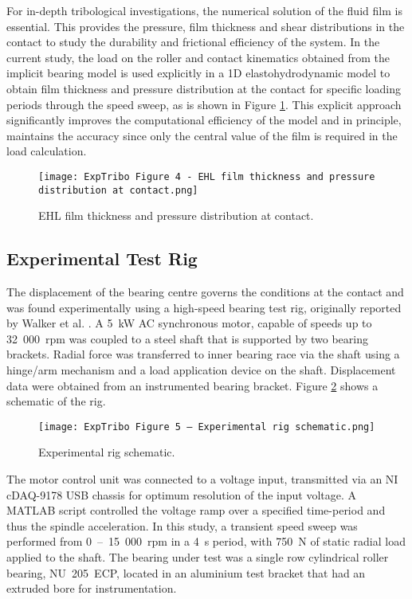 For in-depth tribological investigations, the numerical solution of the fluid film is essential. This provides the pressure, film thickness and shear distributions in the contact to study the durability and frictional efficiency of the system. In the current study, the load on the roller and contact kinematics obtained from the implicit bearing model is used explicitly in a 1D elastohydrodynamic model to obtain film thickness and pressure distribution at the contact for specific loading periods through the speed sweep, as is shown in Figure \ref{EHL film thickness and pressure distribution at contact}. This explicit approach significantly improves the computational efficiency of the model and in principle, maintains the accuracy since only the central value of the film is required in the load calculation.

\begin{figure}
	\centering
	\texttt{[image: ExpTribo Figure 4 - EHL film thickness and pressure distribution at contact.png]}
	\caption{EHL film thickness and pressure distribution at contact.}
	\label{EHL film thickness and pressure distribution at contact}
\end{figure}

\subsection{Experimental Test Rig}

The displacement of the bearing centre governs the conditions at the contact and was found experimentally using a high-speed bearing test rig, originally reported by Walker et al. \cite{Walker2018a}. A 5~kW AC synchronous motor, capable of speeds up to 32~000~rpm was coupled to a steel shaft that is supported by two bearing brackets. Radial force was transferred to inner bearing race via the shaft using a hinge/arm mechanism and a load application device on the shaft. Displacement data were obtained from an instrumented bearing bracket. Figure \ref{Experimental rig schematic} shows a schematic of the rig.

\begin{figure}
	\centering
	\texttt{[image: ExpTribo Figure 5 – Experimental rig schematic.png]}
	\caption{Experimental rig schematic.}
	\label{Experimental rig schematic}
\end{figure}

The motor control unit was connected to a voltage input, transmitted via an NI cDAQ-9178 USB chassis for optimum resolution of the input voltage. A MATLAB script controlled the voltage ramp over a specified time-period and thus the spindle acceleration. In this study, a transient speed sweep was performed from 0~–~15~000~rpm in a 4~s period, with 750~N of static radial load applied to the shaft. The bearing under test was a single row cylindrical roller bearing, NU~205~ECP, located in an aluminium test bracket that had an extruded bore for instrumentation.

